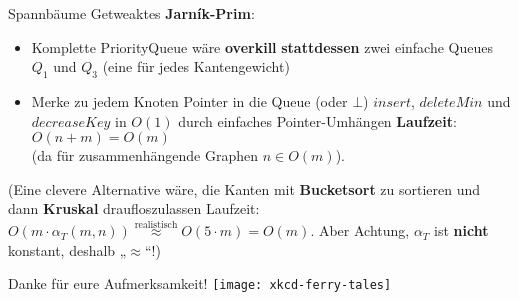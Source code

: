 \begin{frame}{Spannbäume}
	\solutionheading
	Getweaktes \textbf{Jarník-Prim}: \\
	\begin{itemize}
		\item Komplette PriorityQueue wäre \textbf{overkill} \impl \textbf{stattdessen} zwei einfache Queues $Q_1$ und $Q_3$ \quad (eine für jedes Kantengewicht)
		\item Merke zu jedem Knoten Pointer in die Queue (oder $\bot$)
		\implitem $insert$, $deleteMin$ und $decreaseKey$ in $O(1)$ durch einfaches Pointer-Umhängen
		\implitem \textbf{Laufzeit}: $O(n + m) = O(m)$ \\ (da für zusammenhängende Graphen $n \in O(m)$).
	\end{itemize}
	\forcenewline
	\pause
	(Eine clevere Alternative wäre, die Kanten mit \textbf{Bucketsort} zu sortieren und dann \textbf{Kruskal} draufloszulassen \impl Laufzeit: $O\left(m \cdot \alpha_T(m, n)\right) \stackrel{\text{realistisch}}{\approx} O(5 \cdot m) = O(m)$. {\small Aber Achtung, $\alpha_T$ ist \textbf{nicht} konstant, deshalb „$\approx$“!})
\end{frame}



\iffalse

\begin{frame}{Graphen}
	\underline{Aufgabe 5: } \\
	Konstruiert einen gerichteten Graphen mit $n$ Knoten und negativen Kantengewichten (aber \textbf{ohne} negative Zyklen!) so, dass Dijkstra darauf eine Laufzeit in $\Theta(n^3\log n)$ erreicht.
\end{frame}

\fi


\begin{frame}{Danke für eure Aufmerksamkeit! \smiley}
	\centering\texttt{[image: xkcd-ferry-tales]}
\end{frame}


